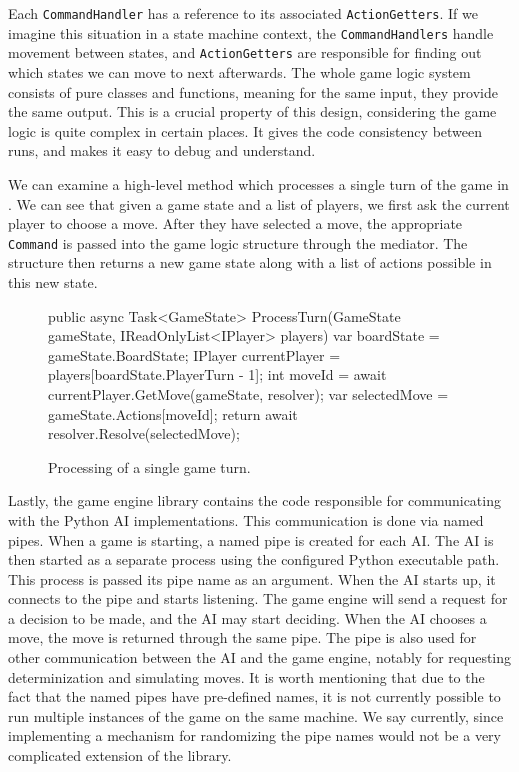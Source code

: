 Each \texttt{CommandHandler} has a reference to its associated \texttt{ActionGetters}.
If we imagine this situation in a state machine context, the \texttt{CommandHandlers}
handle movement between states, and \texttt{ActionGetters} are responsible for
finding out which states we can move to next afterwards. The whole game logic
system consists of pure classes and functions, meaning for the same input,
they provide the same output. This is a crucial property of this design,
considering the game logic is quite complex in certain places. It gives the code
consistency between runs, and makes it easy to debug and understand.

We can examine a high-level method which processes a single turn of the game
in . We can see that given a game state and a list of players,
we first ask the current player to choose a move. After they have selected
a move, the appropriate \texttt{Command} is passed into the game logic
structure through the mediator. The structure then returns a new game state
along with a list of actions possible in this new state.

\begin{figure}[ht]
\begin{code}
public async Task<GameState> ProcessTurn(GameState gameState, 
    IReadOnlyList<IPlayer> players)
{
    var boardState = gameState.BoardState;
    IPlayer currentPlayer = players[boardState.PlayerTurn - 1];
    int moveId = await currentPlayer.GetMove(gameState, resolver);
    var selectedMove = gameState.Actions[moveId];
    return await resolver.Resolve(selectedMove);
}
\end{code}
\caption{Processing of a single game turn.}\label{dd:engineturn}
\end{figure}

Lastly, the game engine library contains the code responsible for communicating
with the Python AI implementations. This communication is done
via named pipes. When a game is starting, a named pipe is created for each
AI. The AI is then started as a separate process using the configured
Python executable path. This process is passed its pipe name
as an argument. When the AI starts up, it connects to the pipe and starts listening.
The game engine will send a request for a decision to be made, and the AI may
start deciding. When the AI chooses a move, the move is returned through
the same pipe. The pipe is also used for other communication between
the AI and the game engine, notably for requesting determinization and
simulating moves. It is worth mentioning that due to the fact that
the named pipes have pre-defined names, it is not currently possible
to run multiple instances of the game on the same machine. We say currently,
since implementing a mechanism for randomizing the pipe names would
not be a very complicated extension of the library.

